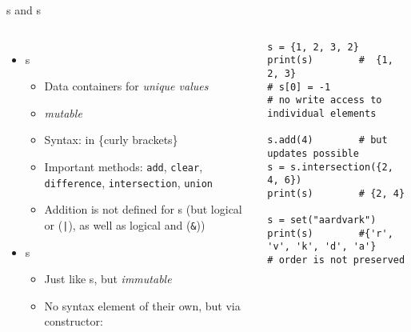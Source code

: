 \begin{frame}[fragile, t]{s and s}
%
\vspace{-15pt}
\begin{columns}[t]
\begin{itemize}
\item {}s
	\begin{itemize}
	\item Data containers for \emph{unique values}
	\item \emph{mutable}
	\item Syntax: in \{curly brackets\}
	\item Important methods: \texttt{add}, \texttt{clear}, \texttt{difference}, \texttt{intersection}, \texttt{union}
	\item Addition is not defined for s (but logical or (\texttt{|}), as well as logical and (\texttt{\&}))
	\end{itemize}
\item {}s
	\begin{itemize}
	\item Just like s, but \emph{immutable}
	\item No syntax element of their own, but via constructor: 
	\end{itemize}
\end{itemize}
%
\begin{codebox}
\begin{verbatim}
s = {1, 2, 3, 2}
print(s)        #  {1, 2, 3}
# s[0] = -1     
# no write access to individual elements

s.add(4)        # but updates possible
s = s.intersection({2, 4, 6})
print(s)        # {2, 4}

s = set("aardvark")
print(s)        #{'r', 'v', 'k', 'd', 'a'}
# order is not preserved
\end{verbatim}
\end{codebox}
\end{columns}
%
\end{frame}


